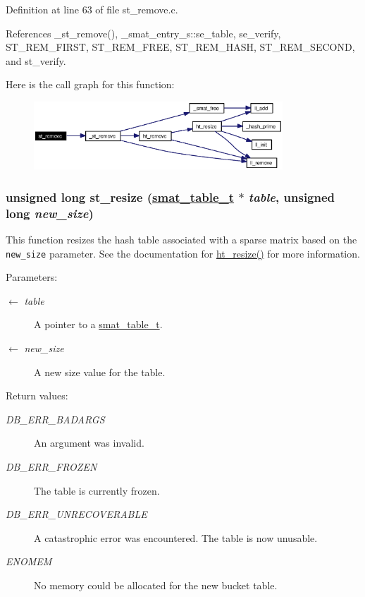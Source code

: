 Definition at line 63 of file st\_\-remove.c.

References \_\-st\_\-remove(), \_\-smat\_\-entry\_\-s::se\_\-table, se\_\-verify, ST\_\-REM\_\-FIRST, ST\_\-REM\_\-FREE, ST\_\-REM\_\-HASH, ST\_\-REM\_\-SECOND, and st\_\-verify.

Here is the call graph for this function:\begin{figure}[H]
\begin{center}
\leavevmode
\includegraphics[width=265pt]{group__dbprim__smat_ga12_cgraph}
\end{center}
\end{figure}
\hypertarget{group__dbprim__smat_ga16}{
\subsubsection[st\_\-resize]{\setlength{\rightskip}{0pt plus 5cm}unsigned long st\_\-resize (\hyperlink{struct__smat__table__s}{smat\_\-table\_\-t} $\ast$ {\em table}, unsigned long {\em new\_\-size})}}
\label{group__dbprim__smat_ga16}


This function resizes the hash table associated with a sparse matrix based on the {\tt new\_\-size} parameter. See the documentation for \hyperlink{group__dbprim__hash_ga17}{ht\_\-resize()} for more information.

\begin{Desc}
\item[Parameters:]
\begin{description}
\item[\mbox{$\leftarrow$} {\em table}]A pointer to a \hyperlink{group__dbprim__smat_ga0}{smat\_\-table\_\-t}. \item[\mbox{$\leftarrow$} {\em new\_\-size}]A new size value for the table.\end{description}
\end{Desc}
\begin{Desc}
\item[Return values:]
\begin{description}
\item[{\em DB\_\-ERR\_\-BADARGS}]An argument was invalid. \item[{\em DB\_\-ERR\_\-FROZEN}]The table is currently frozen. \item[{\em DB\_\-ERR\_\-UNRECOVERABLE}]A catastrophic error was encountered. The table is now unusable. \item[{\em ENOMEM}]No memory could be allocated for the new bucket table.\end{description}
\end{Desc}


